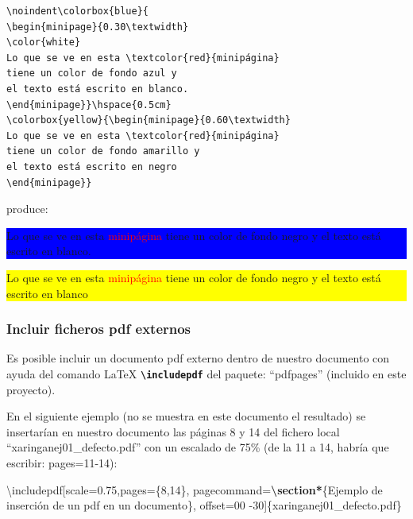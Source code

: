 \documentclass[12pt,a4paper,oneside,]{article}
\newenvironment{Shaded}{\begin{snugshade}}{\end{snugshade}}
\newcommand{\FunctionTok}[1]{\textcolor[rgb]{0.00,0.00,0.00}{#1}}
\newcommand{\KeywordTok}[1]{\textcolor[rgb]{0.13,0.29,0.53}{\textbf{#1}}}
\newcommand{\NormalTok}[1]{#1}
\numberwithin{dummy}{section}
\theoremstyle{ocrenumbox}
\theoremstyle{blacknumex}
\theoremstyle{blacknumbox}
\theoremstyle{ocrenum}
\theoremstyle{ocrenum}
\begin{document}
\begin{verbatim}
\noindent\colorbox{blue}{
\begin{minipage}{0.30\textwidth}
\color{white}
Lo que se ve en esta \textcolor{red}{minipágina} 
tiene un color de fondo azul y
el texto está escrito en blanco. 
\end{minipage}}\hspace{0.5cm} 
\colorbox{yellow}{\begin{minipage}{0.60\textwidth} 
Lo que se ve en esta \textcolor{red}{minipágina} 
tiene un color de fondo amarillo y
el texto está escrito en negro
\end{minipage}}
\end{verbatim}

produce:

\noindent

\colorbox{blue}{
\begin{minipage}{0.30\textwidth}
\color{white}
Lo que se ve en esta \textcolor{red}{minipágina} 
tiene un color de fondo negro y
el texto está escrito en blanco. 
\end{minipage}}\hspace{0.5cm} 
\colorbox{yellow}{\begin{minipage}{0.60\textwidth} 
Lo que se ve en esta \textcolor{red}{minipágina} 
tiene un color de fondo negro y
el texto está escrito en blanco
\end{minipage}}

\texttt{}

\hypertarget{incluir-ficheros-pdf-externos}{%
\subsubsection{Incluir ficheros pdf
externos}\label{incluir-ficheros-pdf-externos}}

Es posible incluir un documento pdf externo dentro de nuestro documento
con ayuda del comando LaTeX \textbf{\texttt{\textbackslash{}includepdf}}
del paquete: ``pdfpages'' (incluido en este proyecto).

En el siguiente ejemplo (no se muestra en este documento el resultado)
se insertarían en nuestro documento las páginas 8 y 14 del fichero local
``xaringanej01\_defecto.pdf'' con un escalado de 75\% (de la 11 a 14,
habría que escribir: pages=11-14):

\begin{Shaded}
\begin{Highlighting}[]
\FunctionTok{\textbackslash{}includepdf}\NormalTok{[scale=0.75,pages=\{8,14\}, }
\NormalTok{  pagecommand=}\KeywordTok{\textbackslash{}section*}\NormalTok{\{Ejemplo de inserción de un pdf en un documento\}, }
\NormalTok{  offset=00 {-}30]\{xaringanej01\_defecto.pdf\}}
\end{Highlighting}
\end{Shaded}
\end{document}
